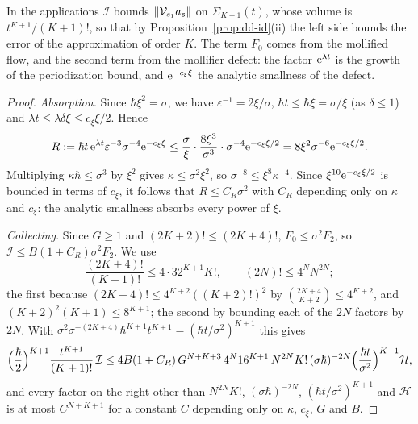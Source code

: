 In the applications $\mathcal I$ bounds $\lVert \mathcal V_{s_1}a_{\mathbf s}\rVert$ on $\Sigma_{K+1}(t)$, whose volume is $t^{K+1}/(K+1)!$, so that by
Proposition~\ref{prop:dd-id}(ii) the left side bounds the error of the approximation of order $K$. The term $F_0$ comes from the
mollified flow, and the second term from the mollifier defect: the factor $\mathrm{e}^{\lambda t}$ is the growth of the periodization bound,
and $\mathrm{e}^{-c_\xi\xi}$ the analytic smallness of the defect.

\begin{proof}
\emph{Absorption.} Since $\hbar\xi^2=\sigma$, we have $\varepsilon^{-1}=2\xi/\sigma$, $\hbar t\le\hbar\xi=\sigma/\xi$ (as $\delta\le1$) and
$\lambda t\le\lambda\delta\xi\le c_\xi\xi/2$. Hence
\[
  R:=\hbar t\,\mathrm{e}^{\lambda t}\varepsilon^{-3}\sigma^{-4}\mathrm{e}^{-c_\xi\xi}\le\frac\sigma\xi\cdot\frac{8\xi^3}{\sigma^3}\cdot\sigma^{-4}\mathrm{e}^{-c_\xi\xi/2}
  =8\xi^2\sigma^{-6}\mathrm{e}^{-c_\xi\xi/2}.
\]
Multiplying $\kappa\hbar\le\sigma^3$ by $\xi^2$ gives $\kappa\le\sigma^2\xi^2$, so $\sigma^{-8}\le\xi^8\kappa^{-4}$. Since $\xi^{10}\mathrm{e}^{-c_\xi\xi/2}$ is
bounded in terms of $c_\xi$, it follows that $R\le C_R\sigma^2$ with $C_R$ depending only on $\kappa$ and $c_\xi$: the analytic smallness
absorbs every power of $\xi$.

\emph{Collecting.} Since $G\ge1$ and $(2K+2)!\le(2K+4)!$, $F_0\le\sigma^2F_2$, so $\mathcal I\le B(1+C_R)\sigma^2F_2$. We use
\begin{equation}\label{eq:factorial-assembly}
  \frac{(2K+4)!}{(K+1)!}\le4\cdot32^{K+1}K!,\qquad(2N)!\le4^NN^{2N};
\end{equation}
the first because $(2K+4)!\le4^{K+2}((K+2)!)^2$ by $\binom{2K+4}{K+2}\le4^{K+2}$, and $(K+2)^2(K+1)\le8^{K+1}$; the second by bounding each of
the $2N$ factors by $2N$. With $\sigma^2\sigma^{-(2K+4)}\hbar^{K+1}t^{K+1}=(\hbar t/\sigma^2)^{K+1}$ this gives
\[
  \Bigl(\frac\hbar2\Bigr)^{K+1}\frac{t^{K+1}}{(K+1)!}\,\mathcal I\le4B(1+C_R)\,G^{N+K+3}\,4^N16^{K+1}\,N^{2N}K!\,(\sigma\hbar)^{-2N}
  \Bigl(\frac{\hbar t}{\sigma^2}\Bigr)^{K+1}\mathcal H,
\]
and every factor on the right other than $N^{2N}K!$, $(\sigma\hbar)^{-2N}$, $(\hbar t/\sigma^2)^{K+1}$ and $\mathcal H$ is at most
$C^{N+K+1}$ for a constant $C$ depending only on $\kappa$, $c_\xi$, $G$ and $B$.
\end{proof}

